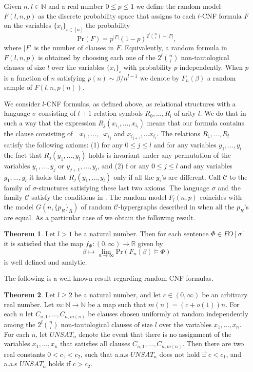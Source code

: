 \documentclass[12pt,notitlepage,a4paper]{article}
\theoremstyle{definition}
\newtheorem{theorem}{Theorem}[section]
\newcommand{\R}{\mathbb{R}}
\newcommand{\N}{\mathbb{N}}
\newcommand{\Ln}{\lim\limits_{n\to \infty}}
\newcommand{\PR}[1]{\mathrm{Pr}\left(#1\right)}
\begin{document}
Given $n, l \in \N$ and a real number $0\leq p \leq 1$ we define
the random model $F(l,n,p)$ as the discrete probability space that
assigns to each $l$-CNF formula $F$ on
the variables $\{x_i\}_{i\in [n]}$
 the probability
\[
\PR{F}= p^{|F|}  (1-p)^{2^l\binom{n}{l}-|F|},
\] 
where $|F|$ is the number of clauses in $F$.
Equivalently, a random formula in $F(l,n,p)$ is obtained
by choosing each one of the $2^l\binom{n}{l}$ non-tautological
clauses of size $l$ over the variables $\{x_i\}_{i}$
with probability $p$ independently. When
$p$ is a function of $n$ satisfying
$p(n)\sim \beta/n^{l-1}$ we denote by $F_n(\beta)$ a random sample
of $F(l,n,p(n))$.
\par	
We consider $l$-CNF formulas, as defined above, as relational 
structures with a language $\sigma$ consisting of $l+1$ relation symbols
$R_0,\dots, R_l$ of arity $l$. We do that in such a way that the expression
$R_j(x_{i_1},\dots,x_{i_l})$ means that our formula contains the clause
consisting of $\neg x_{i_1}, \dots, \neg x_{i_j}$ and $x_{i_{j+1}},\dots
x_{i_l}$. The relations $R_1,\dots, R_l$ satisfy the 
following axioms: (1) for any $0\leq j \leq l$ and 
for any variables $y_1,\dots, y_l$ the fact that
$R_j(y_1,\dots, y_l)$ holds
is invariant under any permutation of the variables 
$y_1,\dots,y_j$ or $y_{j+1},\dots,y_l$, and (2) f
or any $0\leq j \leq l$ and 
any variables $y_1,\dots, y_l$ it holds that
$R_j(y_1,\dots, y_l)$ only if all the $y_i$'s are different. 
Call $\mathcal{C}$ to the family of $\sigma$-structures satisfying these last two axioms.
The language $\sigma$ and the family $\mathcal{C}$ satisfy the conditions in 
. The random model $F_l(n,p)$ coincides with the model
$G(n,\{p_R\}_{R})$ of random $\mathcal{C}$-hypergraphs described in 
 when all the $p_R$'s are equal. As a particular
case of  we obtain the following result. 
\begin{theorem} \label{thm:mainsat}
	Let $l>1$ be a natural number.
	Then for each sentence $\Phi\in FO[\sigma]$ 
	it is satisfied
	that the map $f_\Phi: (0,\infty) \rightarrow \R$ given by
	\[
	\beta \mapsto \Ln \PR{ F_n(\beta)\models \Phi}
	\]
	is well defined and analytic. 
\end{theorem}
The following is a well known result regarding random CNF formulas. 
\begin{theorem} 
Let $l\geq 2$ be a natural number, and let $c\in (0,\infty)$ 
be an arbitrary real number. 
Let $m:\N\rightarrow \N$ be a map such that
$m(n)=(c+o(1))n$. For each $n$ let $C_{n,1},\dots, C_{n,m(n)}$
be clauses chosen uniformly at random independently among the 
$2^l \binom{n}{l}$ non-tautological clauses of size $l$ over the
variables $x_1,\dots, x_n$. For each $n$, let $UNSAT_n$
denote the event that there is no assignment of the variables
$x_1,\dots,x_n$ that satisfies all clauses $C_{n,1},\dots, C_{n,m(n)}$. 
Then there are two real constants $0<c_1<c_2$, such that 
a.a.s $UNSAT_n$ does not hold if $c< c_1$, and a.a.s $UNSAT_n$ holds
if $c> c_2$. 
\end{theorem}
\end{document}
